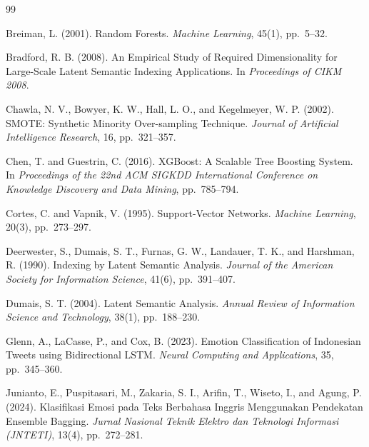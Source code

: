 \documentclass[12pt,a4paper,twoside]{article}
\theoremstyle{definition}
\begin{document}
\begin{thebibliography}{99}

Breiman, L. (2001).
\newblock Random Forests.
\newblock \textit{Machine Learning}, 45(1), pp.~5--32.

Bradford, R. B. (2008).
\newblock An Empirical Study of Required Dimensionality for Large-Scale Latent Semantic Indexing Applications.
\newblock In \textit{Proceedings of CIKM 2008}.

Chawla, N. V., Bowyer, K. W., Hall, L. O., and Kegelmeyer, W. P. (2002).
\newblock SMOTE: Synthetic Minority Over-sampling Technique.
\newblock \textit{Journal of Artificial Intelligence Research}, 16, pp.~321--357.

Chen, T. and Guestrin, C. (2016).
\newblock XGBoost: A Scalable Tree Boosting System.
\newblock In \textit{Proceedings of the 22nd ACM SIGKDD International Conference on Knowledge Discovery and Data Mining}, pp.~785--794.

Cortes, C. and Vapnik, V. (1995).
\newblock Support-Vector Networks.
\newblock \textit{Machine Learning}, 20(3), pp.~273--297.

Deerwester, S., Dumais, S. T., Furnas, G. W., Landauer, T. K., and Harshman, R. (1990).
\newblock Indexing by Latent Semantic Analysis.
\newblock \textit{Journal of the American Society for Information Science}, 41(6), pp.~391--407.

Dumais, S. T. (2004).
\newblock Latent Semantic Analysis.
\newblock \textit{Annual Review of Information Science and Technology}, 38(1), pp.~188--230.

Glenn, A., LaCasse, P., and Cox, B. (2023).
\newblock Emotion Classification of Indonesian Tweets using Bidirectional LSTM.
\newblock \textit{Neural Computing and Applications}, 35, pp.~345--360.

Junianto, E., Puspitasari, M., Zakaria, S. I., Arifin, T., Wiseto, I., and Agung, P. (2024).
\newblock Klasifikasi Emosi pada Teks Berbahasa Inggris Menggunakan Pendekatan Ensemble Bagging.
\newblock \textit{Jurnal Nasional Teknik Elektro dan Teknologi Informasi (JNTETI)}, 13(4), pp.~272--281.


\end{thebibliography}
\end{document}
